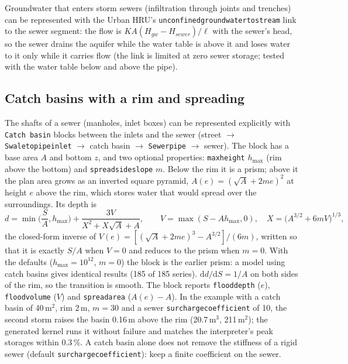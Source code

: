 \documentclass[11pt,a4paper]{article}
\newcommand{\code}[1]{\texttt{\small #1}}
\renewcommand{\_}{\oldus\allowbreak}   %
\begin{document}
Groundwater that enters storm sewers (infiltration through joints and trenches) can be represented
with the Urban HRU's \code{unconfined\_groundwater\_to\_stream} link to the sewer segment: the flow is
$K A (H_{gw}-H_{sewer})/\ell$ with the sewer's head, so the sewer drains the aquifer while the water
table is above it and loses water to it only while it carries flow (the link is limited at zero
sewer storage; tested with the water table below and above the pipe).

\subsection{Catch basins with a rim and spreading}
The shafts of a sewer (manholes, inlet boxes) can be represented explicitly with \code{Catch basin}
blocks between the inlets and the sewer (street $\to$ \code{Swale\_to\_pipe\_inlet} $\to$ catch
basin $\to$ \code{Sewer\_pipe} $\to$ sewer). The block has a base area $A$ and bottom $z$, and two
optional properties: \code{max\_height} $h_{\max}$ (rim above the bottom) and
\code{spread\_side\_slope} $m$. Below the rim it is a prism; above it the plan area grows as an
inverted square pyramid, $A(e)=(\sqrt{A}+2me)^2$ at height $e$ above the rim, which stores water that
would spread over the surroundings. Its depth is
\[
d=\min\!\Big(\frac{S}{A},h_{\max}\Big)+\frac{3V}{X^2+X\sqrt{A}+A},\qquad
V=\max(S-Ah_{\max},0),\quad X=\big(A^{3/2}+6mV\big)^{1/3},
\]
the closed-form inverse of $V(e)=[(\sqrt A+2me)^3-A^{3/2}]/(6m)$, written so that it is exactly $S/A$
when $V=0$ and reduces to the prism when $m=0$. With the defaults ($h_{\max}=10^{12}$, $m=0$) the
block is the earlier prism: a model using catch basins gives identical results (185 of 185 series).
$\mathrm{d}d/\mathrm{d}S=1/A$ on both sides of the rim, so the transition is smooth. The block
reports \code{flood\_depth} ($e$), \code{flood\_volume} ($V$) and \code{spread\_area}
($A(e)-A$). In the example with a catch basin of 40\,m$^2$, rim 2\,m, $m=30$ and a sewer
\code{surcharge\_coefficient} of 10, the second storm raises the basin 0.16\,m above the rim
(20.7\,m$^3$, 211\,m$^2$); the generated kernel runs it without failure and matches the interpreter's
peak storages within 0.3\,\%. A catch basin alone does not remove the stiffness of a rigid sewer
(default \code{surcharge\_coefficient}): keep a finite coefficient on the sewer.
\end{document}
